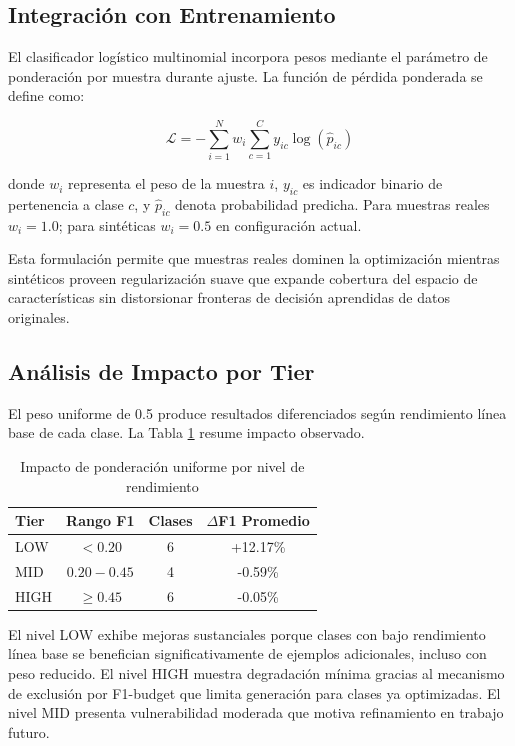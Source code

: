 \subsection{Integración con Entrenamiento}
\label{subsec:integracion_entrenamiento}

El clasificador logístico multinomial incorpora pesos mediante el parámetro de ponderación por muestra durante ajuste. La función de pérdida ponderada se define como:

\begin{equation}
\mathcal{L} = -\sum_{i=1}^{N} w_i \sum_{c=1}^{C} y_{ic} \log(\hat{p}_{ic})
\end{equation}

donde $w_i$ representa el peso de la muestra $i$, $y_{ic}$ es indicador binario de pertenencia a clase $c$, y $\hat{p}_{ic}$ denota probabilidad predicha. Para muestras reales $w_i = 1.0$; para sintéticas $w_i = 0.5$ en configuración actual.

Esta formulación permite que muestras reales dominen la optimización mientras sintéticos proveen regularización suave que expande cobertura del espacio de características sin distorsionar fronteras de decisión aprendidas de datos originales.

\subsection{Análisis de Impacto por Tier}
\label{subsec:impacto_tier}

El peso uniforme de 0.5 produce resultados diferenciados según rendimiento línea base de cada clase. La Tabla \ref{tab:tier_impact} resume impacto observado.

\begin{table}[h]
\centering
\caption{Impacto de ponderación uniforme por nivel de rendimiento}
\label{tab:tier_impact}
\begin{tabular}{lccc}
\hline
Tier & Rango F1 & Clases & $\Delta$F1 Promedio \\
\hline
LOW & $< 0.20$ & 6 & +12.17\% \\
MID & $0.20 - 0.45$ & 4 & -0.59\% \\
HIGH & $\geq 0.45$ & 6 & -0.05\% \\
\hline
\end{tabular}
\end{table}

El nivel LOW exhibe mejoras sustanciales porque clases con bajo rendimiento línea base se benefician significativamente de ejemplos adicionales, incluso con peso reducido. El nivel HIGH muestra degradación mínima gracias al mecanismo de exclusión por F1-budget que limita generación para clases ya optimizadas. El nivel MID presenta vulnerabilidad moderada que motiva refinamiento en trabajo futuro.

